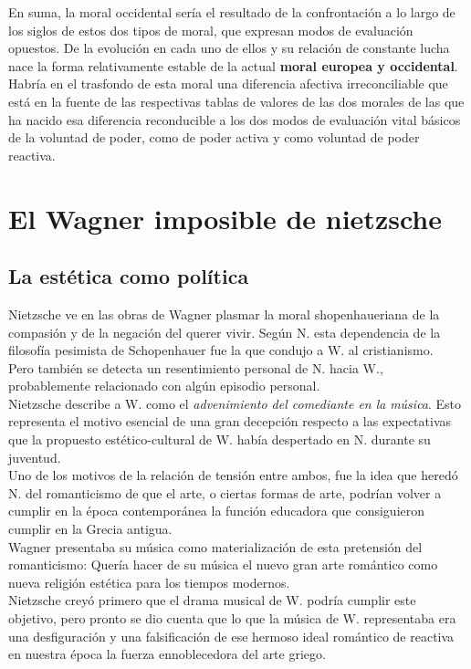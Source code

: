 \documentclass[a4paper, 10pt, twocolumn, spanish]{article}
\begin{document}
En suma, la moral occidental sería el resultado de la confrontación a
lo largo de los siglos de estos dos tipos de moral, que expresan modos
de evaluación opuestos. De la evolución en cada uno de ellos y su
relación de constante lucha nace la forma relativamente estable de la
actual \textbf{moral europea y occidental}. Habría en el trasfondo de esta
moral una diferencia afectiva irreconciliable que está en la fuente de
las respectivas tablas de valores de las dos morales de las que ha
nacido esa diferencia reconducible a los dos modos de evaluación vital
básicos de la voluntad de poder, como de poder activa y como voluntad
de poder reactiva.

\section{El Wagner imposible de nietzsche}
\label{sec:org5f2b3a6}

\subsection{La estética como política}
\label{sec:org567dae2}
Nietzsche ve en las obras de Wagner plasmar la moral shopenhaueriana
de la compasión y de la negación del querer vivir. Según N. esta
dependencia de la filosofía pesimista de Schopenhauer fue la que
condujo a W. al cristianismo.\\[0pt]

Pero también se detecta un resentimiento personal de N. hacia W.,
probablemente relacionado con algún episodio personal.\\[0pt]

Nietzsche describe a W. como el \emph{advenimiento del comediante en la}
\emph{música}. Esto representa el motivo esencial de una gran decepción
respecto a las expectativas que la propuesto estético-cultural de
W. había despertado en N. durante su juventud.\\[0pt]

Uno de los motivos de la relación de tensión entre ambos, fue la idea
que heredó N. del romanticismo de que el arte, o ciertas formas de
arte, podrían volver a cumplir en la época contemporánea la función
educadora que consiguieron cumplir en la Grecia antigua.\\[0pt]

Wagner presentaba su música como materialización de esta pretensión
del romanticismo: Quería hacer de su música el nuevo gran arte
romántico como nueva religión estética para los tiempos modernos.\\[0pt]
Nietzsche creyó primero que el drama musical de W. podría cumplir este
objetivo, pero pronto se dio cuenta que lo que la música de
W. representaba era una desfiguración y una falsificación de ese
hermoso ideal romántico de reactiva en nuestra época la fuerza
ennoblecedora del arte griego.\\[0pt]
\end{document}

